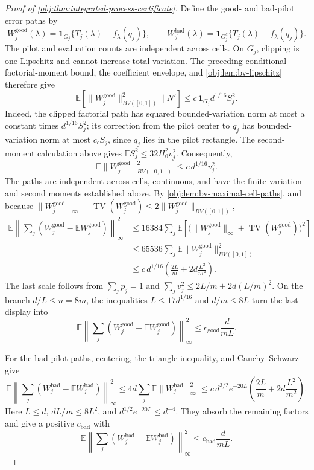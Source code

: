 \documentclass[11pt]{article}
\begin{document}
\begin{proof}[Proof of \cref{obj:thm:integrated-process-certificate}]
Define the good- and bad-pilot error paths by
\[
W_j^{\mathrm{good}}(\lambda)
 =\mathbf1_{G_j}\{T_j(\lambda)-f_\lambda(q_j)\},
\qquad
W_j^{\mathrm{bad}}(\lambda)
 =\mathbf1_{G_j^c}\{T_j(\lambda)-f_\lambda(q_j)\}.
\]
The pilot and evaluation counts are independent across cells. On \(G_j\), clipping is one-Lipschitz and cannot increase total variation. The preceding conditional factorial-moment bound, the coefficient envelope, and \cref{obj:lem:bv-lipschitz} therefore give
\[
\mathbb E\!\left[\|W_j^{\mathrm{good}}\|_{BV([0,1])}^2\mid N'\right]
 \leq c\,\mathbf1_{G_j}d^{1/16}S_j^2.
\]
Indeed, the clipped factorial path has squared bounded-variation norm at most a constant times \(d^{1/16}S_j^2\); its correction from the pilot center to \(q_j\) has bounded-variation norm at most \(c_\epsilon S_j\), since \(q_j\) lies in the pilot rectangle. The second-moment calculation above gives \(\mathbb ES_j^2\leq32H_0^2v_j^2\). Consequently,
\[
\mathbb E\|W_j^{\mathrm{good}}\|_{BV([0,1])}^2
 \leq c\,d^{1/16}v_j^2.
\]
The paths are independent across cells, continuous, and have the finite variation and second moments established above. By \cref{obj:lem:bv-maximal-cell-paths}, and because \(\|W_j^{\mathrm{good}}\|_\infty+\operatorname{TV}(W_j^{\mathrm{good}})\leq2\|W_j^{\mathrm{good}}\|_{BV([0,1])}\),
\[
\begin{aligned}
\mathbb E\left\|\sum_j
 (W_j^{\mathrm{good}}-\mathbb EW_j^{\mathrm{good}})
 \right\|_\infty^2
&\leq 16384\sum_j\mathbb E
 \left[\bigl(\|W_j^{\mathrm{good}}\|_\infty+
 \operatorname{TV}(W_j^{\mathrm{good}})\bigr)^2\right]\\
&\leq65536\sum_j\mathbb E
 \|W_j^{\mathrm{good}}\|_{BV([0,1])}^2\\
&\leq c\,d^{1/16}
 \left(\frac{2L}{m}+2d\frac{L^2}{m^2}\right).
\end{aligned}
\]
The last scale follows from \(\sum_jp_j=1\) and
\(\sum_jv_j^2\leq2L/m+2d(L/m)^2\). On the branch \(d/L\leq n=8m\), the inequalities \(L\leq17d^{1/16}\) and \(d/m\leq8L\) turn the last display into
\[
\mathbb E\left\|\sum_j
 (W_j^{\mathrm{good}}-\mathbb EW_j^{\mathrm{good}})
 \right\|_\infty^2
 \leq c_{\mathrm{good}}\frac d{mL}.
\]

For the bad-pilot paths, centering, the triangle inequality, and Cauchy–Schwarz give
\[
\mathbb E\left\|\sum_j
 (W_j^{\mathrm{bad}}-\mathbb EW_j^{\mathrm{bad}})
 \right\|_\infty^2
 \leq4d\sum_j\mathbb E\|W_j^{\mathrm{bad}}\|_\infty^2
 \leq c\,d^{3/2}e^{-20L}
 \left(\frac{2L}{m}+2d\frac{L^2}{m^2}\right).
\]
Here \(L\leq d\), \(dL/m\leq8L^2\), and
\(d^{1/2}e^{-20L}\leq d^{-4}\). They absorb the remaining factors and give a positive \(c_{\mathrm{bad}}\) with
\[
\mathbb E\left\|\sum_j
 (W_j^{\mathrm{bad}}-\mathbb EW_j^{\mathrm{bad}})
 \right\|_\infty^2
 \leq c_{\mathrm{bad}}\frac d{mL}.
\]


\end{proof}
\end{document}
